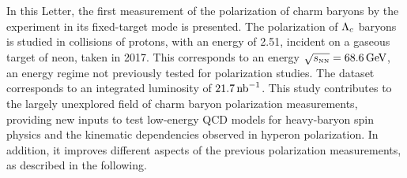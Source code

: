 In this Letter, the first measurement of the polarization of charm baryons by the \lhcb experiment in its fixed-target mode is presented. The polarization of $\Lambda_c$ baryons is studied in collisions of protons, with an energy of 2.51\tev, incident on a gaseous target of neon, taken in 2017. This corresponds to an energy $\protect\sqrt{s_{\scriptscriptstyle\text{NN}}} = 68.6 \text{\,Ge\kern -0.1em V}$, an energy regime not previously tested for polarization studies. The dataset corresponds to an integrated luminosity of $21.7\text{\,nb}^{-1}$. This study contributes to the largely unexplored field of charm baryon polarization measurements, providing new inputs to test low-energy QCD models for heavy-baryon spin physics and the kinematic dependencies observed in hyperon polarization.
In addition, it improves different aspects of the previous polarization measurements, as described in the following.

